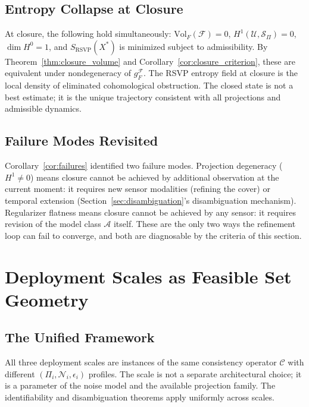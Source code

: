 \documentclass[11pt, oneside]{article}
\begin{document}
\subsection{Entropy Collapse at Closure}

At closure, the following hold simultaneously:
$\mathrm{Vol}_F(\mathcal{F}) = 0$, $H^1(\mathcal{U}, \mathcal{S}_\Pi) = 0$,
$\dim H^0 = 1$, and $S_{\mathrm{RSVP}}(X^*)$ is minimized subject to admissibility.
By Theorem~\ref{thm:closure_volume} and Corollary~\ref{cor:closure_criterion}, these are
equivalent under nondegeneracy of $g_F^{\mathcal{F}}$. The RSVP entropy field at closure
is the local density of eliminated cohomological obstruction. The closed state is not a
best estimate; it is the unique trajectory consistent with all projections and admissible
dynamics.

\subsection{Failure Modes Revisited}

Corollary~\ref{cor:failures} identified two failure modes. Projection degeneracy
($H^1 \ne 0$) means closure cannot be achieved by additional observation at the current
moment: it requires new sensor modalities (refining the cover) or temporal extension
(Section~\ref{sec:disambiguation}'s disambiguation mechanism). Regularizer flatness means
closure cannot be achieved by any sensor: it requires revision of the model class
$\mathcal{A}$ itself. These are the only two ways the refinement loop can fail to
converge, and both are diagnosable by the criteria of this section.

\section{Deployment Scales as Feasible Set Geometry}
\label{sec:deployment}

\subsection{The Unified Framework}

All three deployment scales are instances of the same consistency operator $\mathcal{C}$
with different $(\Pi_i, \mathcal{N}_i, \epsilon_i)$ profiles. The scale is not a
separate architectural choice; it is a parameter of the noise model and the available
projection family. The identifiability and disambiguation theorems apply uniformly across
scales.
\end{document}
